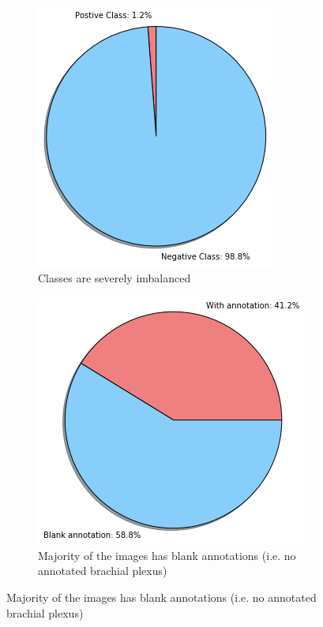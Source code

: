 \documentclass{article}
\begin{document}
\begin{figure}[h]
    \centering
    \begin{subfigure}[b]{0.6\linewidth}
        \includegraphics[width=1.0\linewidth]{figures/distribution_1.png}
        \caption{Classes are severely imbalanced}
        \label{fig:distribution_1}
    \end{subfigure}

   \begin{subfigure}[b]{0.7\linewidth}
        \includegraphics[width=1.0\linewidth]{figures/distribution_2.png}
        \caption{Majority of the images has blank annotations (i.e. no annotated brachial plexus)}
        \label{fig:distribution_2}
    \end{subfigure}


\end{figure}
\end{document}
